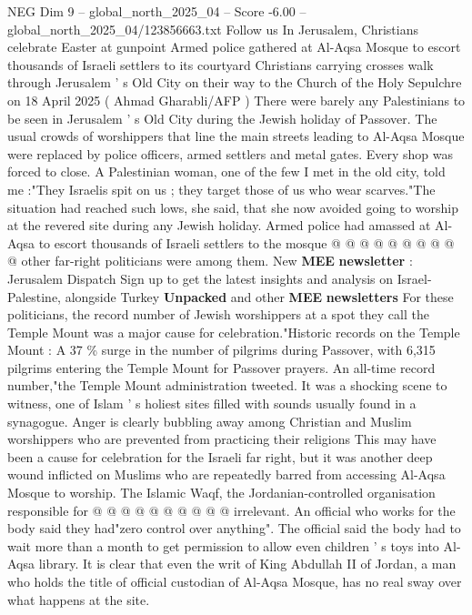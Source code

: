 \begin{textsample}{NEG Dim 9 – global\_north\_2025\_04 – Score -6.00 – global\_north\_2025\_04/123856663.txt}  \label{ex:f9_neg_035}
Follow us In Jerusalem, Christians celebrate Easter at gunpoint Armed police gathered at Al-Aqsa Mosque to escort thousands of Israeli settlers to its courtyard Christians carrying crosses walk through Jerusalem ' s Old City on their way to the Church of the Holy Sepulchre on 18 April 2025 ( Ahmad Gharabli/AFP ) There were barely any Palestinians to be seen in Jerusalem ' s Old City during the Jewish holiday of Passover.
The usual crowds of worshippers that line the main streets leading to Al-Aqsa Mosque were replaced by police officers, armed settlers and metal gates.
Every shop was forced to close.
A Palestinian woman, one of the few I met in the old city, told me :"They Israelis spit on us ; they target those of us who wear scarves."The situation had reached such lows, she said, that she now avoided going to worship at the revered site during any Jewish holiday.
Armed police had amassed at Al-Aqsa to escort thousands of Israeli settlers to the mosque @ @ @ @ @ @ @ @ @ @ other far-right politicians were among them.
New \textbf{MEE} \textbf{newsletter} : Jerusalem Dispatch Sign up to get the latest insights and analysis on Israel-Palestine, alongside Turkey \textbf{Unpacked} and other \textbf{MEE} \textbf{newsletters} For these politicians, the record number of Jewish worshippers at a spot they call the Temple Mount was a major cause for celebration."Historic records on the Temple Mount : A 37 \% surge in the number of pilgrims during Passover, with 6,315 pilgrims entering the Temple Mount for Passover prayers.
An all-time record number,"the Temple Mount administration tweeted.
It was a shocking scene to witness, one of Islam ' s holiest sites filled with sounds usually found in a synagogue.
Anger is clearly bubbling away among Christian and Muslim worshippers who are prevented from practicing their religions This may have been a cause for celebration for the Israeli far right, but it was another deep wound inflicted on Muslims who are repeatedly barred from accessing Al-Aqsa Mosque to worship.
The Islamic Waqf, the Jordanian-controlled organisation responsible for @ @ @ @ @ @ @ @ @ @ irrelevant.
An official who works for the body said they had"zero control over anything".
The official said the body had to wait more than a month to get permission to allow even children ' s toys into Al-Aqsa library.
It is clear that even the writ of King Abdullah II of Jordan, a man who holds the title of official custodian of Al-Aqsa Mosque, has no real sway over what happens at the site.

\end{textsample}
